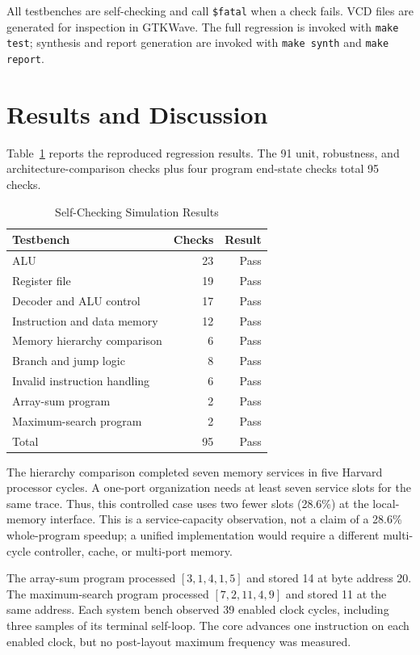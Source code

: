 \documentclass[conference]{IEEEtran}
\begin{document}
All testbenches are self-checking and call \texttt{\$fatal} when a check fails. VCD files are generated for inspection in GTKWave. The full regression is invoked with \texttt{make test}; synthesis and report generation are invoked with \texttt{make synth} and \texttt{make report}.

\section{Results and Discussion}
Table~\ref{tab:results} reports the reproduced regression results. The 91 unit, robustness, and architecture-comparison checks plus four program end-state checks total 95 checks.

\begin{table}[t]
\centering
\caption{Self-Checking Simulation Results}
\label{tab:results}
\begin{tabular}{@{}lrr@{}}
\toprule
Testbench & Checks & Result \\
\midrule
ALU & 23 & Pass \\
Register file & 19 & Pass \\
Decoder and ALU control & 17 & Pass \\
Instruction and data memory & 12 & Pass \\
Memory hierarchy comparison & 6 & Pass \\
Branch and jump logic & 8 & Pass \\
Invalid instruction handling & 6 & Pass \\
Array-sum program & 2 & Pass \\
Maximum-search program & 2 & Pass \\
\midrule
Total & 95 & Pass \\
\bottomrule
\end{tabular}
\end{table}

The hierarchy comparison completed seven memory services in five Harvard processor cycles. A one-port organization needs at least seven service slots for the same trace. Thus, this controlled case uses two fewer slots (28.6\%) at the local-memory interface. This is a service-capacity observation, not a claim of a 28.6\% whole-program speedup; a unified implementation would require a different multi-cycle controller, cache, or multi-port memory.

The array-sum program processed $[3,1,4,1,5]$ and stored 14 at byte address 20. The maximum-search program processed $[7,2,11,4,9]$ and stored 11 at the same address. Each system bench observed 39 enabled clock cycles, including three samples of its terminal self-loop. The core advances one instruction on each enabled clock, but no post-layout maximum frequency was measured.
\end{document}
